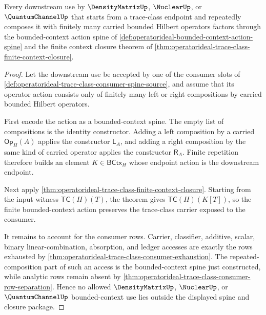 \begin{theorem}
\label{thm:operatorideal-consumer-context-exhaustion}
Every downstream use by $\DensityMatrixUp$, $\NuclearUp$, or $\QuantumChannelUp$ that starts from a trace-class endpoint and repeatedly composes it with finitely many carried bounded Hilbert operators factors through the bounded-context action spine of \autoref{def:operatorideal-bounded-context-action-spine} and the finite context closure theorem of \autoref{thm:operatorideal-trace-class-finite-context-closure}.
\end{theorem}
\begin{proof}
Let the downstream use be accepted by one of the consumer slots of \autoref{def:operatorideal-trace-class-consumer-spine-source}, and assume that its operator action consists only of finitely many left or right compositions by carried bounded Hilbert operators.

First encode the action as a bounded-context spine. The empty list of compositions is the identity constructor. Adding a left composition by a carried $\mathsf{Op}_H(A)$ applies the constructor $\mathsf{L}_A$, and adding a right composition by the same kind of carried operator applies the constructor $\mathsf{R}_A$. Finite repetition therefore builds an element $K\in\mathsf{BCtx}_H$ whose endpoint action is the downstream endpoint.

Next apply \autoref{thm:operatorideal-trace-class-finite-context-closure}. Starting from the input witness $\mathsf{TC}(H)(T)$, the theorem gives $\mathsf{TC}(H)(K[T])$, so the finite bounded-context action preserves the trace-class carrier exposed to the consumer.

It remains to account for the consumer rows. Carrier, classifier, additive, scalar, binary linear-combination, absorption, and ledger accesses are exactly the rows exhausted by \autoref{thm:operatorideal-trace-class-consumer-exhaustion}. The repeated-composition part of such an access is the bounded-context spine just constructed, while analytic rows remain absent by \autoref{thm:operatorideal-trace-class-consumer-row-separation}. Hence no allowed $\DensityMatrixUp$, $\NuclearUp$, or $\QuantumChannelUp$ bounded-context use lies outside the displayed spine and closure package.
\end{proof}

